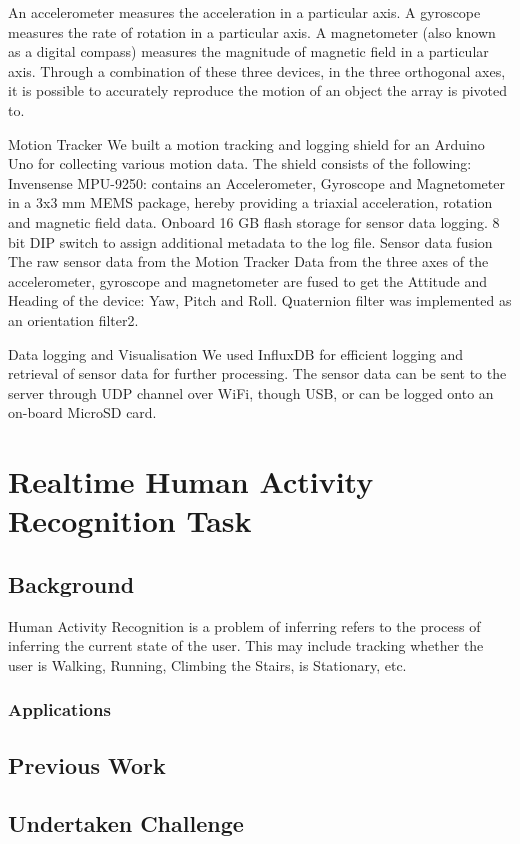 \documentclass[
10pt, %
a4paper, %
oneside, %
headinclude,footinclude, %
BCOR5mm, %
]{scrartcl}
\begin{document}
An accelerometer measures the acceleration in a particular axis.
A gyroscope measures the rate of rotation in a particular axis.
A magnetometer (also known as a digital compass) measures the magnitude of magnetic field in a particular axis.
Through a combination of these three devices, in the three orthogonal axes, it is possible to accurately reproduce the motion of an object the array is pivoted to.

Motion Tracker
We built a motion tracking and logging shield for an Arduino Uno for collecting various motion data. The shield consists of the following:
Invensense MPU-9250: contains an Accelerometer, Gyroscope and Magnetometer in a 3x3 mm MEMS package, hereby providing a triaxial acceleration, rotation and magnetic field data.
Onboard 16 GB flash storage for sensor data logging.
8 bit DIP switch to assign additional metadata to the log file.
Sensor data fusion
The raw sensor data from the Motion Tracker 
Data from the three axes of the accelerometer, gyroscope and magnetometer are fused to get the Attitude and Heading of the device: Yaw, Pitch and Roll.
Quaternion filter was implemented as an orientation filter2.

Data logging and Visualisation
We used InfluxDB for efficient logging and retrieval of sensor data for further processing.
The sensor data can be sent to the server through UDP channel over WiFi, though USB, or can be logged onto an on-board MicroSD card.

\section{Realtime Human Activity Recognition Task}

\subsection{Background}
Human Activity Recognition is a problem of inferring  refers to the process of inferring the current state of the user. This may include tracking whether the user is Walking, Running, Climbing the Stairs, is Stationary, etc.
\subsubsection{Applications}

\subsection{Previous Work}
\subsection{Undertaken Challenge}
\end{document}
